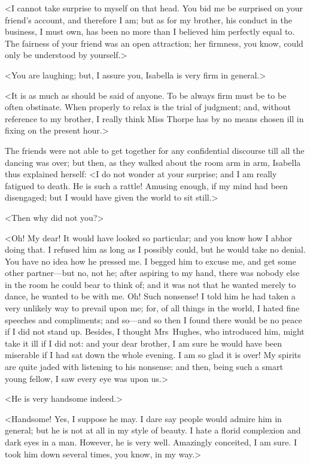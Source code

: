  <I cannot take surprise to myself on that head. You bid me be surprised on your friend's account, and therefore I am; but as for my brother, his conduct in the business, I must own, has been no more than I believed him perfectly equal to. The fairness of your friend was an open attraction; her firmness, you know, could only be understood by yourself.> 

 <You are laughing; but, I assure you, Isabella is very firm in general.> 

 <It is as much as should be said of anyone. To be always firm must be to be often obstinate. When properly to relax is the trial of judgment; and, without reference to my brother, I really think Miss Thorpe has by no means chosen ill in fixing on the present hour.> 

 The friends were not able to get together for any confidential discourse till all the dancing was over; but then, as they walked about the room arm in arm, Isabella thus explained herself: <I do not wonder at your surprise; and I am really fatigued to death. He is such a rattle! Amusing enough, if my mind had been disengaged; but I would have given the world to sit still.> 

 <Then why did not you?> 

 <Oh! My dear! It would have looked so particular; and you know how I abhor doing that. I refused him as long as I possibly could, but he would take no denial. You have no idea how he pressed me. I begged him to excuse me, and get some other partner—but no, not he; after aspiring to my hand, there was nobody else in the room he could bear to think of; and it was not that he wanted merely to dance, he wanted to be with me. Oh! Such nonsense! I told him he had taken a very unlikely way to prevail upon me; for, of all things in the world, I hated fine speeches and compliments; and so—and so then I found there would be no peace if I did not stand up. Besides, I thought Mrs~Hughes, who introduced him, might take it ill if I did not: and your dear brother, I am sure he would have been miserable if I had sat down the whole evening. I am so glad it is over! My spirits are quite jaded with listening to his nonsense: and then, being such a smart young fellow, I saw every eye was upon us.> 

 <He is very handsome indeed.> 

 <Handsome! Yes, I suppose he may. I dare say people would admire him in general; but he is not at all in my style of beauty. I hate a florid complexion and dark eyes in a man. However, he is very well. Amazingly conceited, I am sure. I took him down several times, you know, in my way.> 

